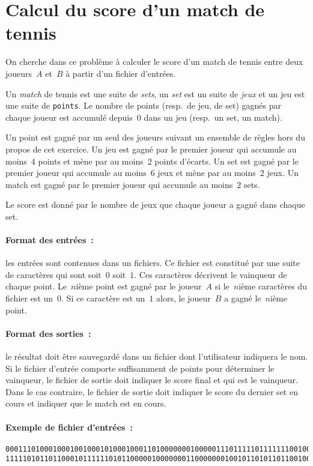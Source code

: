 \section{Calcul du score d'un match de tennis}
\label{sec:ScoreTennis}
On  cherche dans  ce probl\`eme \`a  calculer le  score d'un  match de
tennis  entre  deux   joueurs~$A$  et~$B$ \`a   partir   d'un  fichier
d'entr\'ees.
\par
Un    \textit{match}  de tennis est  une    suite de \textit{sets}, un
\textit{set} est un suite de \textit{jeux} et un jeu  est une suite de
\texttt{points}. Le nombre de points  (resp.\ de jeu, de set) gagn\'es
par chaque joueur   est accumul\'e depuis~$0$ dans  un  jeu (resp.\ un
set, un match).

Un point  est gagn\'e par un  seul des joueurs  suivant un ensemble de
r\`egles hors du propos de  cet exercice. Un   jeu est gagn\'e par  le
premier  joueur qui  accumule  au  moins~$4$  points et m\`ene  par au
moins~$2$ points d'\'ecarts. Un set est  gagn\'e par le premier joueur
qui  accumule au moins~$6$ jeux  et m\`ene par   au moins~$2$ jeux. Un
match est gagn\'e par le premier joueur qui accumule au moins~$2$ sets.
\par
Le score est donn\'e par le nombre de jeux que chaque joueur a gagn\'e
dans chaque set.
\paragraph{Format des entr\'ees~:}
les   entr\'ees sont contenues    dans un  fichiers.  Ce fichier   est
constitu\'e par une suite de caract\`eres  qui sont soit~$0$ soit~$1$. 
Ces caract\`eres  d\'ecrivent      le vainqueur de     chaque point.   
Le~$n$i\`eme   point est gagn\'e   par  le joueur~$A$  si le~$n$i\`eme
caract\`eres  du  fichier  est un~$0$.  Si ce   caract\`ere est un~$1$
alors, le joueur~$B$ a gagn\'e le~$n$i\`eme point.
\paragraph{Format des sorties~:}
le  r\'esultat     doit \^etre  sauvegard\'e  dans   un   fichier dont
l'utilisateur indiquera  le  nom.  Si  le  fichier d'entr\'ee comporte
suffisamment de  points pour d\'eterminer le   vainqueur, le fichier de
sortie doit indiquer le score final et  qui est le vainqueur.  Dans le
cas contraire, le fichier de sortie  doit indiquer le score du dernier
set en cours et indiquer que le match est en cours.

\paragraph{Exemple de fichier d'entr\'ees~:}
\begin{verbatim}
000111010001000100100010100010001101000000010000011101111101111111001001010
111110101101100010111111010110000010000000110000000100101101011011001000101111111
\end{verbatim}

